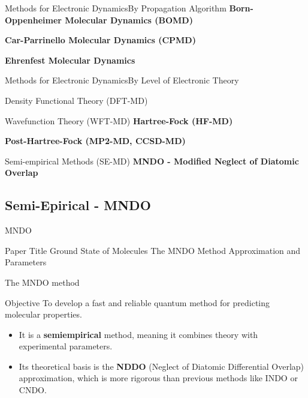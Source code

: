 \begin{frame}{Methods for Electronic Dynamics}{By Propagation Algorithm}
    \textbf{Born-Oppenheimer Molecular Dynamics (BOMD)}
    \vspace{1em}
    
    \textbf{Car-Parrinello Molecular Dynamics (CPMD)}
    \vspace{1em}
    
    \textbf{Ehrenfest Molecular Dynamics}
\end{frame}

\begin{frame}{Methods for Electronic Dynamics}{By Level of Electronic Theory}
    \begin{block}{Density Functional Theory (DFT-MD)}
    \end{block}
    
    \begin{block}{Wavefunction Theory (WFT-MD)}
        \textbf{Hartree-Fock (HF-MD)}
        \vspace{0.5em}
        
        \textbf{Post-Hartree-Fock (MP2-MD, CCSD-MD)}
    \end{block}
    
    \begin{block}{Semi-empirical Methods (SE-MD)}
    	\textbf{MNDO - Modified Neglect of Diatomic Overlap}
    \end{block}
\end{frame}

\subsection{Semi-Epirical - MNDO}

\begin{frame}{MNDO}
	\begin{block}{Paper Title}
	Ground State of Molecules The MNDO Method Approximation and Parameters
	\end{block}
\end{frame}

\begin{frame}{The MNDO method}
    \begin{block}{Objective}
        To develop a fast and reliable quantum method for predicting molecular properties.
    \end{block}
    \pause
    
    \begin{itemize}
        \item It is a \textbf{semiempirical} method, meaning it combines theory with experimental parameters.
        \pause
        \bigskip
        \item Its theoretical basis is the \textbf{NDDO} (Neglect of Diatomic Differential Overlap) approximation, which is more rigorous than previous methods like INDO or CNDO.
    \end{itemize}
\end{frame}

